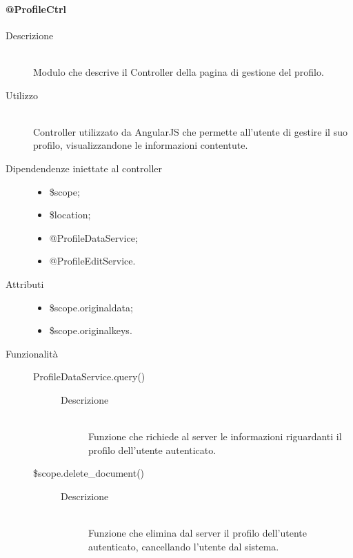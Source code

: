 \paragraph{@ProfileCtrl}
\begin{description}
 \item[Descrizione] \hfill \\
 Modulo che descrive il Controller della pagina di gestione del profilo.
 
 \item[Utilizzo] \hfill \\
 Controller utilizzato da AngularJS che permette all'utente di gestire il suo profilo, visualizzandone le informazioni contentute.
 
 \item[Dipendendenze iniettate al controller] \hfill 
 \begin{itemize}
  \item \$scope;
  \item \$location;
  \item @ProfileDataService;
  \item @ProfileEditService.
  
 \end{itemize}
 
 \item[Attributi] \hfill 
 \begin{itemize}
 	\item \$scope.original\textunderscore data;
 	\item \$scope.original\textunderscore keys.
 \end{itemize}
 
 \item[Funzionalità] \hfill 
 \begin{description}
  \item[ProfileDataService.query()] \hfill 
   \begin{description}
  	\item[Descrizione] \hfill \\
	Funzione che richiede al server le informazioni riguardanti il profilo dell'utente autenticato.
	\end{description}
	
 \item[\$scope.delete\_document()] \hfill
    \begin{description}
	 	\item[Descrizione] \hfill \\	 
  Funzione che elimina dal server il profilo dell'utente autenticato, cancellando l'utente dal sistema.
  	 \end{description}

  \end{description}
  
  
\end{description}

